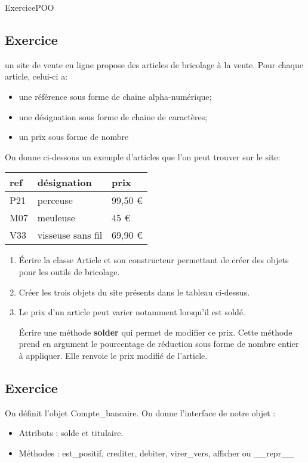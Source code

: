 \documentclass[11pt,a4paper]{article}
\newcounter{numexo}
\begin{document}
\begin{NSI}
{Exercice}{POO}
\end{NSI}


\addtocounter{numexo}{1}
\subsection*{\Large Exercice \thenumexo}
un site de vente en ligne propose des articles de bricolage à la vente. Pour chaque article, celui-ci a:
\begin{itemize}
\item une référence sous forme de chaine alpha-numérique;
\item une désignation sous forme de chaine de caractères;
\item un prix sous forme de nombre
\end{itemize}
On donne ci-dessous un exemple d'articles que l'on peut trouver sur le site:

\begin{center}
\begin{tabular}{*{3}{|C{4cm}}|}\hline
ref & désignation & prix \\\hline
P21 & perceuse & 99,50 \euro \\\hline
M07 & meuleuse & 45 \euro \\\hline
V33 & visseuse sans fil & 69,90 \euro \\\hline
\end{tabular}
\end{center}

\begin{enumerate}
\item Écrire la classe Article et son constructeur permettant de créer des objets pour les outils de bricolage.
\item Créer les trois objets du site présents dans le tableau ci-dessus.
\item Le prix d'un article peut varier notamment lorsqu'il est soldé. 

Écrire une méthode \textbf{solder} qui permet de modifier ce prix. Cette méthode prend en argument le pourcentage de réduction sous forme de nombre entier à appliquer. Elle renvoie le prix modifié de l'article.
\end{enumerate}

\addtocounter{numexo}{1}
\subsection*{\Large Exercice \thenumexo}
On définit l'objet Compte\_bancaire. On donne l'interface de notre objet :
\begin{itemize}
\item Attributs : solde et titulaire.
\item Méthodes : est\_positif, crediter, debiter, virer\_vers, afficher ou \_\_repr\_\_
\end{itemize}
\end{document}
